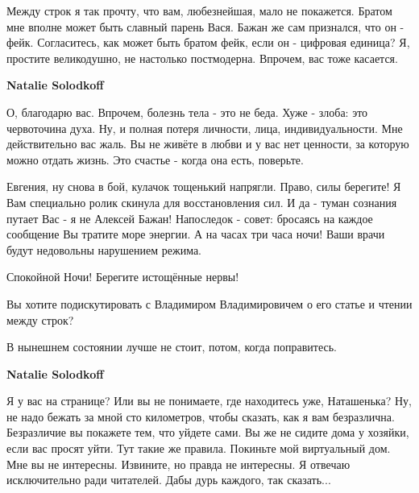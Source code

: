 \begin{itemize}
\begin{itemize}
Между строк я так прочту, что вам, любезнейшая, мало не покажется. Братом мне
вполне может быть славный парень Вася. Бажан же сам признался, что он - фейк.
Согласитесь, как может быть братом фейк, если он - цифровая единица? Я,
простите великодушно, не настолько постмодерна. Впрочем, вас тоже касается.


 
\textbf{Natalie Solodkoff} 

О, благодарю вас. Впрочем, болезнь тела - это не беда. Хуже - злоба: это
червоточина духа. Ну, и полная потеря личности, лица, индивидуальности. Мне
действительно вас жаль. Вы не живёте в любви и у вас нет ценности, за которую
можно отдать жизнь. Это счастье - когда она есть, поверьте.

 

Евгения, ну снова в бой, кулачок тощенький напрягли. Право, силы берегите! Я
Вам специально ролик скинула для восстановления сил. И да - туман сознания
путает Вас - я не Алексей Бажан! Напоследок - совет: бросаясь на каждое
сообщение Вы тратите море энергии. А на часах три часа ночи! Ваши врачи будут
недовольны нарушением режима. 

Спокойной Ночи! Берегите истощённые нервы! 

Вы хотите подискутировать с Владимиром Владимировичем о его статье и чтении
между строк? 

В нынешнем состоянии лучше не стоит, потом, когда поправитесь.

 
\textbf{Natalie Solodkoff} 

Я у вас на странице? Или вы не понимаете, где находитесь уже, Наташенька? Ну,
не надо бежать за мной сто километров, чтобы сказать, как я вам безразлична.
Безразличие вы покажете тем, что уйдете сами. Вы же не сидите дома у хозяйки,
если вас просят уйти. Тут такие же правила. Покиньте мой виртуальный дом. Мне
вы не интересны. Извините, но правда не интересны. Я отвечаю исключительно ради
читателей. Дабы дурь каждого, так сказать...



\end{itemize}
\end{itemize}
